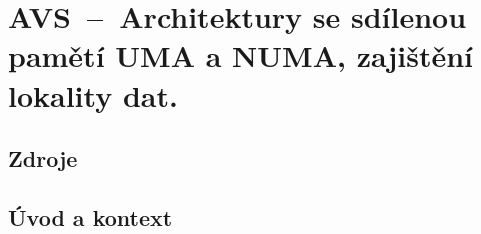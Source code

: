 

\graphicspath{{avs/architektury_se_sdilenou_pameti/figures}}


\chapter{AVS~--~Architektury se sdílenou pamětí UMA a NUMA, zajištění lokality dat.}


\section{Zdroje}

\begin{compactitem}
    \item {}
\end{compactitem}


\section{Úvod a kontext}

\begin{compactitem}
    \item {}
\end{compactitem}
